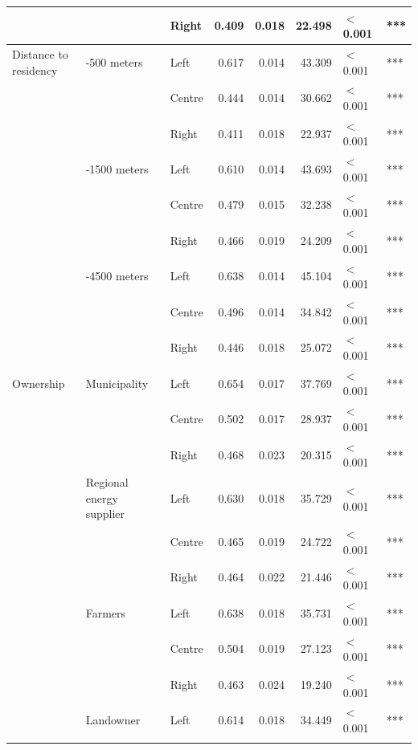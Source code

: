 \begin{longtable}[t]{>{\raggedright\arraybackslash}p{4cm}>{\raggedright\arraybackslash}p{4cm}>{\raggedright\arraybackslash}p{2.5cm}rrrll}
\cmidrule{3-8}\nopagebreak
 &  & Right & 0.409 & 0.018 & 22.498 & $<$0.001 & ***\\
\cmidrule{1-8}\pagebreak[0]
Distance to residency & 0-500 meters & Left & 0.617 & 0.014 & 43.309 & $<$0.001 & ***\\
\cmidrule{3-8}\nopagebreak
 &  & Centre & 0.444 & 0.014 & 30.662 & $<$0.001 & ***\\
\cmidrule{3-8}\nopagebreak
 &  & Right & 0.411 & 0.018 & 22.937 & $<$0.001 & ***\\
\cmidrule{2-8}\nopagebreak
 & 500-1500 meters & Left & 0.610 & 0.014 & 43.693 & $<$0.001 & ***\\
\cmidrule{3-8}\nopagebreak
 &  & Centre & 0.479 & 0.015 & 32.238 & $<$0.001 & ***\\
\cmidrule{3-8}\nopagebreak
 &  & Right & 0.466 & 0.019 & 24.209 & $<$0.001 & ***\\
\cmidrule{2-8}\nopagebreak
 & 1500-4500 meters & Left & 0.638 & 0.014 & 45.104 & $<$0.001 & ***\\
\cmidrule{3-8}\nopagebreak
 &  & Centre & 0.496 & 0.014 & 34.842 & $<$0.001 & ***\\
\cmidrule{3-8}\nopagebreak
 &  & Right & 0.446 & 0.018 & 25.072 & $<$0.001 & ***\\
\cmidrule{1-8}\pagebreak[0]
Ownership & Municipality & Left & 0.654 & 0.017 & 37.769 & $<$0.001 & ***\\
\cmidrule{3-8}\nopagebreak
 &  & Centre & 0.502 & 0.017 & 28.937 & $<$0.001 & ***\\
\cmidrule{3-8}\nopagebreak
 &  & Right & 0.468 & 0.023 & 20.315 & $<$0.001 & ***\\
\cmidrule{2-8}\nopagebreak
 & Regional energy supplier & Left & 0.630 & 0.018 & 35.729 & $<$0.001 & ***\\
\cmidrule{3-8}\nopagebreak
 &  & Centre & 0.465 & 0.019 & 24.722 & $<$0.001 & ***\\
\cmidrule{3-8}\nopagebreak
 &  & Right & 0.464 & 0.022 & 21.446 & $<$0.001 & ***\\
\cmidrule{2-8}\nopagebreak
 & Farmers & Left & 0.638 & 0.018 & 35.731 & $<$0.001 & ***\\
\cmidrule{3-8}\nopagebreak
 &  & Centre & 0.504 & 0.019 & 27.123 & $<$0.001 & ***\\
\cmidrule{3-8}\nopagebreak
 &  & Right & 0.463 & 0.024 & 19.240 & $<$0.001 & ***\\
\cmidrule{2-8}\nopagebreak
 & Landowner & Left & 0.614 & 0.018 & 34.449 & $<$0.001 & ***\\
\cmidrule{3-8}\nopagebreak

\end{longtable}
